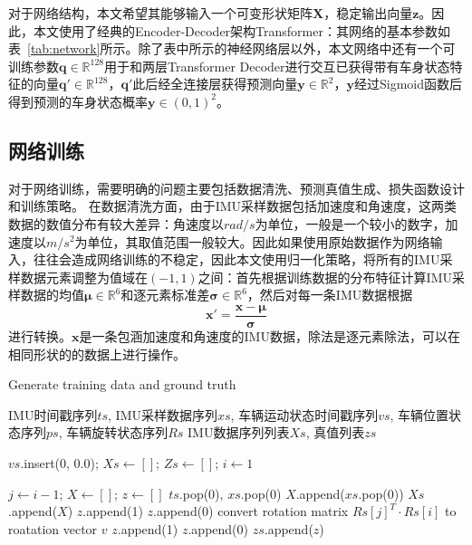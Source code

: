 对于网络结构，本文希望其能够输入一个可变形状矩阵$\symbf{X}$，稳定输出向量$\symbf{z}$。因此，本文使用了经典的Encoder-Decoder架构Transformer\cite{vaswani2017attention}：其网络的基本参数如表~\ref{tab:network}所示。除了表中所示的神经网络层以外，本文网络中还有一个可训练参数$\symbf{q} \in \mathbb{R}^{128}$用于和两层Transformer Decoder进行交互已获得带有车身状态特征的向量$\symbf{q}' \in \mathbb{R}^{128}$，$\symbf{q}'$此后经全连接层获得预测向量$\symbf{y} \in \mathbb{R}^2$，$\symbf{y}$经过Sigmoid函数后得到预测的车身状态概率$\symbf{y} \in (0, 1)^2$。

\subsection{网络训练}

对于网络训练，需要明确的问题主要包括数据清洗、预测真值生成、损失函数设计和训练策略。
在数据清洗方面，由于IMU采样数据包括加速度和角速度，这两类数据的数值分布有较大差异：角速度以$rad/s$为单位，一般是一个较小的数字，加速度以$m/s^2$为单位，其取值范围一般较大。因此如果使用原始数据作为网络输入，往往会造成网络训练的不稳定，因此本文使用归一化策略，将所有的IMU采样数据元素调整为值域在$(-1, 1)$之间：首先根据训练数据的分布特征计算IMU采样数据的均值$\symbf{\mu}\in \mathbb{R}^6$和逐元素标准差$\symbf{\sigma}\in \mathbb{R}^6$，然后对每一条IMU数据根据
\begin{equation}
  \symbf{x}' = \frac{\symbf{x} - \symbf{\mu}}{\symbf{\sigma}}
\end{equation}
进行转换。$\symbf{x}$是一条包涵加速度和角速度的IMU数据，除法是逐元素除法，可以在相同形状的的数据上进行操作。

\renewcommand{\algorithmicrequire}{\textbf{输入：}\unskip}
\renewcommand{\algorithmicensure}{\textbf{输出：}\unskip}
\begin{algorithm}
  \caption{Generate training data and ground truth}
  \label{alg1}
  \small
  \begin{algorithmic}[1]
    \REQUIRE IMU时间戳序列$ts$, IMU采样数据序列$xs$, 车辆运动状态时间戳序列$vs$, 车辆位置状态序列$ps$, 车辆旋转状态序列$Rs$
    \ENSURE IMU数据序列列表$Xs$, 真值列表$zs$

    \STATE $vs$.insert(0, 0.0); $Xs \leftarrow []$; $Zs \leftarrow []$; $i \leftarrow 1$

      \STATE $j \leftarrow i-1$; $X \leftarrow []$; $z \leftarrow []$
        \STATE $ts$.pop(0), $xs$.pop(0)
      \ENDWHILE
        \STATE $X$.append($xs$.pop(0))
      \ENDWHILE
      \STATE $Xs$.append($X$)
        \STATE $z$.append(1)
      \ELSE
        \STATE $z$.append(0)
      \ENDIF
      \STATE convert rotation matrix $Rs[j]^T \cdot Rs[i]$ to roatation vector $v$
        \STATE $z$.append(1)
      \ELSE
        \STATE $z$.append(0)
      \ENDIF
      \STATE $zs$.append($z$)
    \ENDWHILE
  \end{algorithmic}
\end{algorithm}

